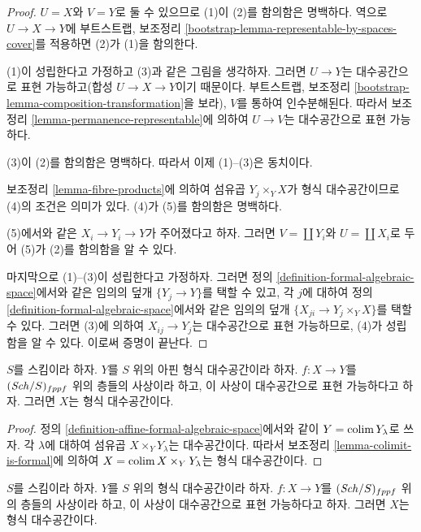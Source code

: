 \begin{proof}
$U = X$와 $V = Y$로 둘 수 있으므로 (1)이 (2)를 함의함은 명백하다.
역으로 $U \to X \to Y$에 부트스트랩, 보조정리
\ref{bootstrap-lemma-representable-by-spaces-cover}를 적용하면
(2)가 (1)을 함의한다.

\medskip\noindent
(1)이 성립한다고 가정하고 (3)과 같은 그림을 생각하자. 그러면
$U \to Y$는 대수공간으로 표현 가능하고(합성
$U \to X \to Y$이기 때문이다. 부트스트랩, 보조정리
\ref{bootstrap-lemma-composition-transformation}을 보라), $V$를
통하여 인수분해된다. 따라서 보조정리
\ref{lemma-permanence-representable}에 의하여 $U \to V$는
대수공간으로 표현 가능하다.

\medskip\noindent
(3)이 (2)를 함의함은 명백하다. 따라서 이제 (1)--(3)은 동치이다.

\medskip\noindent
보조정리 \ref{lemma-fibre-products}에 의하여 섬유곱
$Y_j \times_Y X$가 형식 대수공간이므로 (4)의 조건은 의미가 있다.
(4)가 (5)를 함의함은 명백하다.

\medskip\noindent
(5)에서와 같은 $X_i \to Y_i \to Y$가 주어졌다고 하자. 그러면
$V = \coprod Y_i$와 $U = \coprod X_i$로 두어 (5)가 (2)를
함의함을 알 수 있다.

\medskip\noindent
마지막으로 (1)--(3)이 성립한다고 가정하자. 그러면 정의
\ref{definition-formal-algebraic-space}에서와 같은 임의의 덮개
$\{Y_j \to Y\}$를 택할 수 있고, 각 $j$에 대하여 정의
\ref{definition-formal-algebraic-space}에서와 같은 임의의 덮개
$\{X_{ji} \to Y_j \times_Y X\}$를 택할 수 있다.
그러면 (3)에 의하여 $X_{ij} \to Y_j$는 대수공간으로 표현
가능하므로, (4)가 성립함을 알 수 있다. %
이로써 증명이 끝난다.
\end{proof}

\begin{lemma}
\label{lemma-algebraic-space-over-affine-formal}
$S$를 스킴이라 하자. $Y$를 $S$ 위의 아핀 형식 대수공간이라 하자.
$f : X \to Y$를 $(\mathit{Sch}/S)_{fppf}$ 위의 층들의 사상이라 하고,
이 사상이 대수공간으로 표현 가능하다고 하자. 그러면 $X$는
형식 대수공간이다.
\end{lemma}

\begin{proof}
정의 \ref{definition-affine-formal-algebraic-space}에서와 같이
$Y = \mathop{\mathrm{colim}}\nolimits Y_\lambda$로 쓰자. 각 $\lambda$에 대하여 섬유곱
$X \times_Y Y_\lambda$는 대수공간이다. 따라서 보조정리
\ref{lemma-colimit-is-formal}에 의하여
$X = \mathop{\mathrm{colim}}\nolimits X \times_Y Y_\lambda$는 형식 대수공간이다.
\end{proof}

\begin{lemma}
\label{lemma-representable-by-algebraic-spaces}
$S$를 스킴이라 하자. $Y$를 $S$ 위의 형식 대수공간이라 하자.
$f : X \to Y$를 $(\mathit{Sch}/S)_{fppf}$ 위의 층들의 사상이라 하고,
이 사상이 대수공간으로 표현 가능하다고 하자. 그러면 $X$는
형식 대수공간이다.
\end{lemma}

